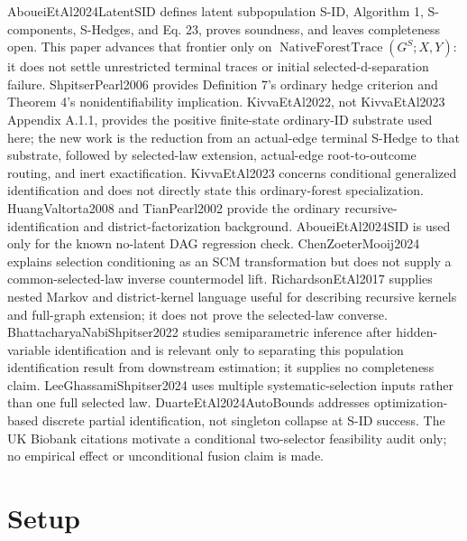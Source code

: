 \documentclass{article}
\begin{document}
AboueiEtAl2024LatentSID defines latent subpopulation S-ID, Algorithm 1, S-components, S-Hedges, and Eq. 23, proves soundness, and leaves completeness open. This paper advances that frontier only on \(\operatorname{NativeForestTrace}(G^S;X,Y)\): it does not settle unrestricted terminal traces or initial selected-d-separation failure. ShpitserPearl2006 provides Definition 7's ordinary hedge criterion and Theorem 4's nonidentifiability implication. KivvaEtAl2022, not KivvaEtAl2023 Appendix A.1.1, provides the positive finite-state ordinary-ID substrate used here; the new work is the reduction from an actual-edge terminal S-Hedge to that substrate, followed by selected-law extension, actual-edge root-to-outcome routing, and inert exactification. KivvaEtAl2023 concerns conditional generalized identification and does not directly state this ordinary-forest specialization. HuangValtorta2008 and TianPearl2002 provide the ordinary recursive-identification and district-factorization background. AboueiEtAl2024SID is used only for the known no-latent DAG regression check. ChenZoeterMooij2024 explains selection conditioning as an SCM transformation but does not supply a common-selected-law inverse countermodel lift. RichardsonEtAl2017 supplies nested Markov and district-kernel language useful for describing recursive kernels and full-graph extension; it does not prove the selected-law converse. BhattacharyaNabiShpitser2022 studies semiparametric inference after hidden-variable identification and is relevant only to separating this population identification result from downstream estimation; it supplies no completeness claim. LeeGhassamiShpitser2024 uses multiple systematic-selection inputs rather than one full selected law. DuarteEtAl2024AutoBounds addresses optimization-based discrete partial identification, not singleton collapse at S-ID success. The UK Biobank citations motivate a conditional two-selector feasibility audit only; no empirical effect or unconditional fusion claim is made.

\section{Setup}
\end{document}
